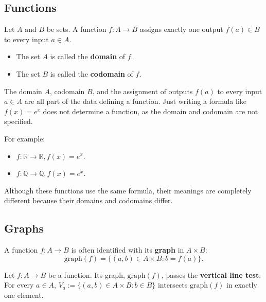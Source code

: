 \documentclass[11pt]{article}
\begin{document}
\subsection{Functions}
\begin{definition}
    Let $A$ and $B$ be sets. A function $f: A \to B$ assigns exactly one output $f(a) \in B$ to every input $a \in A$.
\end{definition}
\begin{itemize}
    \item The set $A$ is called the \textbf{domain} of $f$.
    \item The set $B$ is called the \textbf{codomain} of $f$.
\end{itemize}

\begin{fact}The domain $A$, codomain $B$, and the assignment of outputs $f(a)$ to every input $a \in A$ are all part of the data defining a function. Just writing a formula like $f(x) = e^x$ does not determine a function, as the domain and codomain are not specified.
\end{fact}
For example:
\begin{itemize}
    \item $f: \mathbb{R} \to \mathbb{R}, f(x) = e^x$.
    \item $f: \mathbb{Q} \to \mathbb{Q}, f(x) = e^x$.
\end{itemize}
Although these functions use the same formula, their meanings are completely different because their domains and codomains differ.

\subsection{Graphs}
A function $f: A \to B$ is often identified with its \textbf{graph} in $A
    \times B$:
\[ \text{graph}(f) = \{(a, b) \in A \times B : b = f(a)\}. \]

\begin{lemma}
    Let $f: A \to B$ be a function. Its graph, $\text{graph}(f)$, passes the \textbf{vertical line test}: For every $a \in A$, $V_a := \{(a, b) \in A \times B : b \in B\}$ intersects $\text{graph}(f)$ in exactly one element.
\end{lemma}
\begin{center}
\end{center}
\end{document}
